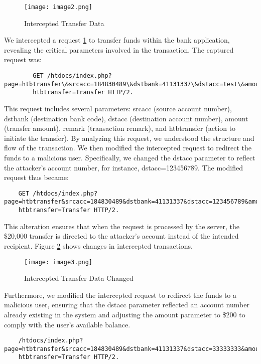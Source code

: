 \begin{figure}[H]
    \centering
    \texttt{[image: image2.png]}
    \caption{Intercepted Transfer Data}
    \label{fig:interceptedTransferData}
\end{figure}
We intercepted a request \ref{fig:interceptedTransferData} to transfer funds within the bank application, revealing the critical parameters involved in the transaction. 
The captured request was: 
\begin{tiny}
	\begin{verbatim}
		GET /htdocs/index.php?page=htbtransfer\&srcacc=184830489\&dstbank=41131337\&dstacc=test\&amount=20000\&remark=dusan\&
		htbtransfer=Transfer HTTP/2. 
	\end{verbatim}
\end{tiny}

This request includes several parameters: srcacc (source account number), dstbank (destination bank code), dstacc (destination account number), amount (transfer amount), remark (transaction remark), and htbtransfer (action to initiate the transfer). By analyzing this request, we understood the structure and flow of the transaction. We then modified the intercepted request to redirect the funds to a malicious user. Specifically, we changed the dstacc parameter to reflect the attacker's account number, for instance, dstacc=123456789. The modified request thus became: 
\begin{tiny}
\begin{verbatim} 
	GET /htdocs/index.php?page=htbtransfer&srcacc=184830489&dstbank=41131337&dstacc=123456789&amount=20000&remark=dusan&
	htbtransfer=Transfer HTTP/2. 
\end{verbatim}
\end{tiny}

This alteration ensures that when the request is processed by the server, the \$20,000 transfer is directed to the attacker’s account instead of the intended recipient. Figure \ref{fig:interceptedTransferDataChanged} shows changes in intercepted transactions.
\begin{figure}[H]
    \centering
    \texttt{[image: image3.png]}
    \caption{Intercepted Transfer Data Changed}
    \label{fig:interceptedTransferDataChanged}
\end{figure}

Furthermore, we modified the intercepted request to redirect the funds to a malicious user, ensuring that the dstacc parameter reflected an account number already existing in the system and adjusting the amount parameter to \$200 to comply with the user's available balance.
\begin{tiny}
\begin{verbatim} 
	/htdocs/index.php?page=htbtransfer&srcacc=184830489&dstbank=41131337&dstacc=33333333&amount=200&remark=dusan&
	htbtransfer=Transfer HTTP/2. 
\end{verbatim}
\end{tiny}

